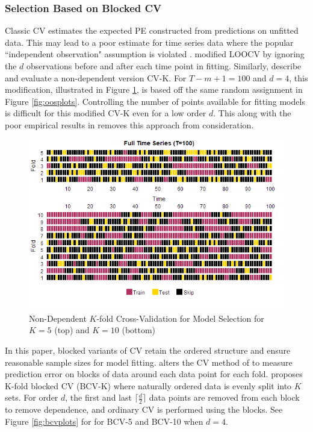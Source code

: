 \subsubsection{Selection Based on Blocked CV}
Classic CV estimates the expected PE constructed from predictions on unfitted data. This may lead to a poor estimate for time series data where the popular ``independent observation" assumption is violated \citep{Arlot2010}. \cite{Burman1994} modified LOOCV by ignoring the $d$ observations before and after each time point in fitting. Similarly, \cite{Bergmeir2018} describe and evaluate a non-dependent version CV-K. For $T-m+1=100$ and $d=4$, this modification, illustrated in Figure \ref{fig:depkcvplots}, is based off the same random assignment in Figure \ref{fig:oosplots}. Controlling the number of points available for fitting models is difficult for this modified CV-K even for a low order $d$. This along with the poor empirical results in \cite{Bergmeir2018} removes this approach from consideration.

\begin{figure}[htbp!]
	\caption{Non-Dependent $K$-fold Cross-Validation for Model Selection for $K=5$ (top) and $K=10$ (bottom)}
	\center
	\label{fig:depkcvplots}
	\includegraphics[scale=0.58]{depkcvplots}
\end{figure}

In this paper, blocked variants of CV retain the ordered structure and ensure reasonable sample sizes for model fitting. \cite{Racine2000} alters the CV method of \cite{Burman1994} to measure prediction error on blocks of data around each data point for each fold. \cite{Bergmeir2012} proposes K-fold blocked CV (BCV-K) where naturally ordered data is evenly split into $K$ sets.  For order $d$, the first and last $\lceil \frac{d}{2} \rceil$ data points are removed from each block to remove dependence, and ordinary CV is performed using the blocks. See Figure \ref{fig:bcvplots} for for BCV-5 and BCV-10 when $d=4$. 

